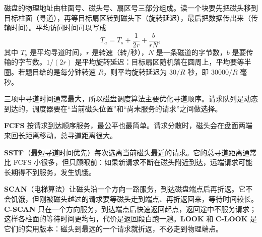 磁盘的物理地址由柱面号、磁头号、扇区号三部分组成。读一个块要先把磁头移到目标柱面（寻道），再等目标扇区转到磁头下（旋转延迟），最后把数据传出来（传输时间）。平均访问时间可以写成
\[
T_a=T_s+\frac{1}{2r}+\frac{b}{rN},
\]
其中 $T_s$ 是平均寻道时间，$r$ 是转速（转/秒），$N$ 是一条磁道的字节数，$b$ 是要传输的字节数。$1/(2r)$ 是平均旋转延迟：目标扇区随机落在圆周上，平均要等半圈。若题目给的是每分钟转速 $R$，则平均旋转延迟为 $30/R$ 秒，即 $30000/R$ 毫秒。

三项中寻道时间通常最大，所以磁盘调度算法主要优化寻道顺序。请求队列是动态到达的，调度器要在“当前磁头位置”和“尚未服务的请求”之间做选择。

\textbf{FCFS} 按请求到达顺序服务，最公平也最简单。请求分散时，磁头会在盘面两端来回长距离移动，总寻道距离很大。

\textbf{SSTF}（最短寻道时间优先）每次选离当前磁头最近的请求。它的总寻道距离通常比 FCFS 小很多，但只顾眼前：如果新请求不断在磁头附近到达，远端请求可能长期得不到服务，发生饥饿。

\textbf{SCAN}（电梯算法）让磁头沿一个方向一路服务，到达磁盘端点后再折返。它不会饥饿，但刚被磁头越过的请求要等磁头走到端点、再折返回来，等待时间较长。\textbf{C-SCAN} 只在一个方向服务，到达端点后快速返回起点，返回途中不服务请求；这样各柱面的等待时间更均匀，代价是返回段白跑一趟。\textbf{LOOK} 和 \textbf{C-LOOK} 是它们的实用版本：磁头到最远的一个请求就折返，不必走到物理端点。

